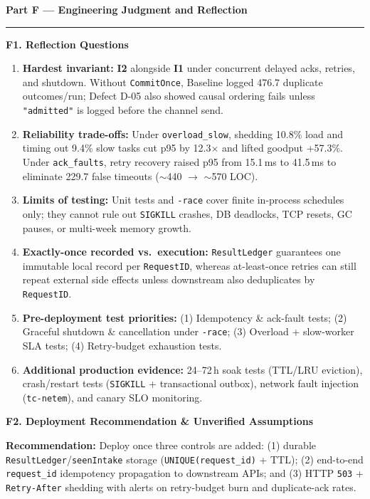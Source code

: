 \documentclass[11pt]{article}
\newcommand{\partheader}[1]{%
    \vspace{1.0em}%
    {\noindent\fontsize{13.5}{16}\selectfont\textbf{\color{accentblue}#1}\par}%
    \vspace{0.2em}\hrule\vspace{0.7em}%
}
\newcommand{\subhead}[1]{\vspace{0.6em}\noindent\textbf{\large #1}\par\vspace{0.25em}}
\begin{document}
\clearpage
\partheader{Part F --- Engineering Judgment and Reflection}

\subhead{F1. Reflection Questions}
\begin{enumerate}
    \item \textbf{Hardest invariant:} \textbf{I2} alongside \textbf{I1} under concurrent delayed acks, retries, and shutdown. Without \texttt{CommitOnce}, Baseline logged 476.7 duplicate outcomes/run; Defect D-05 also showed causal ordering fails unless \texttt{"admitted"} is logged before the channel send.
    \item \textbf{Reliability trade-offs:} Under \texttt{overload\_slow}, shedding 10.8\% load and timing out 9.4\% slow tasks cut p95 by 12.3$\times$ and lifted goodput +57.3\%. Under \texttt{ack\_faults}, retry recovery raised p95 from 15.1\,ms to 41.5\,ms to eliminate 229.7 false timeouts ($\sim$440 $\rightarrow$ $\sim$570 LOC).
    \item \textbf{Limits of testing:} Unit tests and \texttt{-race} cover finite in-process schedules only; they cannot rule out \texttt{SIGKILL} crashes, DB deadlocks, TCP resets, GC pauses, or multi-week memory growth.
    \item \textbf{Exactly-once recorded vs.\ execution:} \texttt{ResultLedger} guarantees one immutable local record per \texttt{RequestID}, whereas at-least-once retries can still repeat external side effects unless downstream also deduplicates by \texttt{RequestID}.
    \item \textbf{Pre-deployment test priorities:} (1) Idempotency \& ack-fault tests; (2) Graceful shutdown \& cancellation under \texttt{-race}; (3) Overload + slow-worker SLA tests; (4) Retry-budget exhaustion tests.
    \item \textbf{Additional production evidence:} 24--72\,h soak tests (TTL/LRU eviction), crash/restart tests (\texttt{SIGKILL} + transactional outbox), network fault injection (\texttt{tc-netem}), and canary SLO monitoring.
\end{enumerate}

\subhead{F2. Deployment Recommendation \& Unverified Assumptions}
\textbf{Recommendation:} Deploy  once three controls are added: (1) durable \texttt{ResultLedger}/\texttt{seenIntake} storage (\texttt{UNIQUE(request\_id)} + TTL); (2) end-to-end \texttt{request\_id} idempotency propagation to downstream APIs; and (3) HTTP \texttt{503} + \texttt{Retry-After} shedding with alerts on retry-budget burn and duplicate-ack rates.
\end{document}
